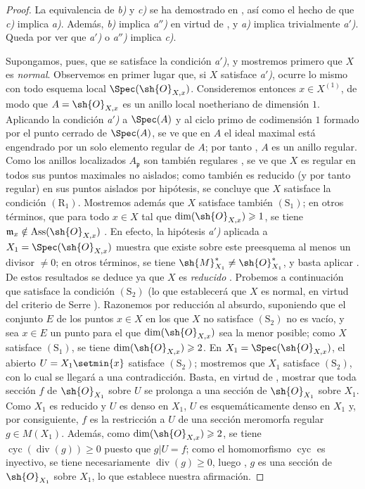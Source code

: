 \begin{proof}
La equivalencia de \emph{b)} y \emph{c)} se ha demostrado en , así como el hecho de que \emph{c)} implica \emph{a)}.
Además, \emph{b)} implica \emph{a$''$)} en virtud de , y \emph{a)} implica trivialmente \emph{a$'$)}.
Queda por ver que \emph{a$'$)} o \emph{a$''$)} implica \emph{c)}.

Supongamos, pues, que se satisface la condición \emph{a$'$)}, y mostremos primero que $X$ es \emph{normal}.
Observemos en primer lugar que, si $X$ satisface \emph{a$'$)}, ocurre lo mismo con todo esquema local $\Spec(\sh{O}_{X,x})$.
Consideremos entonces $x\in X^{(1)}$, de modo que $A=\sh{O}_{X,x}$ es un anillo local noetheriano de dimensión $1$.
Aplicando la condición \emph{a$'$)} a $\Spec(A)$ y al ciclo primo de codimensión $1$ formado por el punto cerrado de $\Spec(A)$, se ve que en $A$ el ideal maximal está engendrado por un solo elemento regular de $A$;
por tanto , $A$ es un anillo regular.
Como los anillos localizados $A_{\mathfrak p}$ son también regulares , se ve que $X$ es regular en todos sus puntos maximales no aislados;
como también es reducido (y por tanto regular) en sus puntos aislados por hipótesis, se concluye que $X$ satisface la condición $(\mathrm{R}_1)$.
Mostremos además que $X$ satisface también $(\mathrm{S}_1)$; en otros términos, que para todo $x\in X$ tal que $\dim(\sh{O}_{X,x})\geq1$, se tiene $\mathfrak{m}_x\notin\operatorname{Ass}(\sh{O}_{X,x})$ .
En efecto, la hipótesis \emph{a$'$)} aplicada a $X_1=\Spec(\sh{O}_{X,x})$ muestra que existe sobre este preesquema al menos un divisor $\neq0$; en otros términos, se tiene $\sh{M}_{X_1}^*\neq\sh{O}_{X_1}^*$, y basta aplicar .
De estos resultados se deduce ya que $X$ es \emph{reducido} .
Probemos a continuación que satisface la condición $(\mathrm{S}_2)$ (lo que establecerá que $X$ es normal, en virtud del criterio de Serre ).
Razonemos por reducción al absurdo, suponiendo que el conjunto $E$ de los puntos $x\in X$ en los que $X$ no satisface $(\mathrm{S}_2)$ no es vacío, y sea $x\in E$ un punto para el que $\dim(\sh{O}_{X,x})$ sea la menor posible;
como $X$ satisface $(\mathrm{S}_1)$, se tiene $\dim(\sh{O}_{X,x})\geq2$.
En $X_1=\Spec(\sh{O}_{X,x})$, el abierto $U=X_1\setmin\{x\}$ satisface $(\mathrm{S}_2)$;
mostremos que $X_1$ satisface $(\mathrm{S}_2)$, con lo cual se llegará a una contradicción.
Basta, en virtud de , mostrar que toda sección $f$ de $\sh{O}_{X_1}$ sobre $U$ se prolonga a una sección de $\sh{O}_{X_1}$ sobre $X_1$.
Como $X_1$ es reducido y $U$ es denso en $X_1$, $U$ es esquemáticamente denso en $X_1$ y, por consiguiente, $f$ es la restricción a $U$ de una sección meromorfa regular $g\in M(X_1)$.
Además, como $\dim(\sh{O}_{X,x})\geq2$, se tiene $\operatorname{cyc}(\operatorname{div}(g))\geq0$ puesto que $g|U=f$;
como el homomorfismo $\operatorname{cyc}$ es inyectivo, se tiene necesariamente $\operatorname{div}(g)\geq0$, luego , $g$ es una sección de $\sh{O}_{X_1}$ sobre $X_1$, lo que establece nuestra afirmación.


\end{proof}

